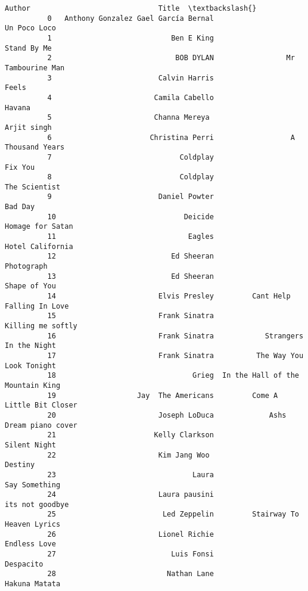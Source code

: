 \documentclass[11pt]{article}
\begin{document}
\begin{Verbatim}[commandchars=\\\{\}]
                                           Author                              Title  \textbackslash{}
          0   Anthony Gonzalez Gael García Bernal                     Un Poco Loco     
          1                            Ben E King                       Stand By Me    
          2                             BOB DYLAN                 Mr Tambourine Man    
          3                         Calvin Harris                             Feels    
          4                        Camila Cabello                            Havana    
          5                        Channa Mereya                        Arjit singh    
          6                       Christina Perri                  A Thousand Years    
          7                              Coldplay                           Fix You    
          8                              Coldplay                     The Scientist    
          9                         Daniel Powter                           Bad Day    
          10                              Deicide                  Homage for Satan    
          11                               Eagles                  Hotel California    
          12                           Ed Sheeran                        Photograph    
          13                           Ed Sheeran                      Shape of You    
          14                        Elvis Presley         Cant Help Falling In Love    
          15                        Frank Sinatra                 Killing me softly    
          16                        Frank Sinatra            Strangers In the Night    
          17                        Frank Sinatra          The Way You Look Tonight    
          18                                Grieg  In the Hall of the Mountain King    
          19                   Jay  The Americans         Come A Little Bit Closer     
          20                        Joseph LoDuca             Ashs Dream piano cover   
          21                       Kelly Clarkson                     Silent Night     
          22                        Kim Jang Woo                            Destiny    
          23                                Laura                     Say Something    
          24                        Laura pausini                   its not goodbye    
          25                         Led Zeppelin         Stairway To Heaven Lyrics    
          26                        Lionel Richie                      Endless Love    
          27                           Luis Fonsi                         Despacito    
          28                          Nathan Lane                     Hakuna Matata    

\end{Verbatim}
\end{document}
